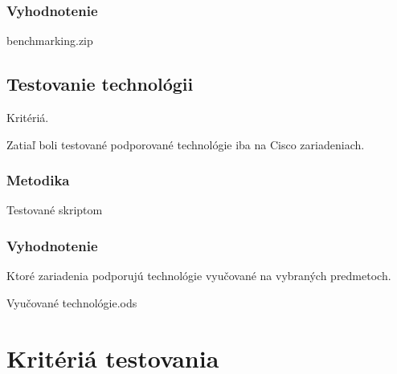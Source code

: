 \subsubsection{Vyhodnotenie}

benchmarking.zip

\subsection{Testovanie technológii}

Kritériá.

Zatiaľ boli testované podporované technológie iba na Cisco zariadeniach.

\subsubsection{Metodika}

Testované skriptom

\subsubsection{Vyhodnotenie}

Ktoré zariadenia podporujú technológie vyučované na vybraných predmetoch.

Vyučované technológie.ods

\section{Kritériá testovania}